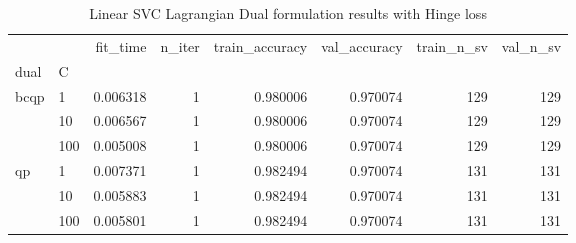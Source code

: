 \begin{table}[H]
\centering
\caption{Linear SVC Lagrangian Dual formulation results with Hinge loss}
\label{linear_lagrangian_dual_svc_cv_results}
\begin{tabular}{llrrrrrr}
\toprule
   &     &  fit\_time &  n\_iter &  train\_accuracy &  val\_accuracy &  train\_n\_sv &  val\_n\_sv \\
dual & C &           &         &                 &               &             &           \\
\midrule
bcqp & 1   &  0.006318 &       1 &        0.980006 &      0.970074 &         129 &       129 \\
   & 10  &  0.006567 &       1 &        0.980006 &      0.970074 &         129 &       129 \\
   & 100 &  0.005008 &       1 &        0.980006 &      0.970074 &         129 &       129 \\
qp & 1   &  0.007371 &       1 &        0.982494 &      0.970074 &         131 &       131 \\
   & 10  &  0.005883 &       1 &        0.982494 &      0.970074 &         131 &       131 \\
   & 100 &  0.005801 &       1 &        0.982494 &      0.970074 &         131 &       131 \\
\bottomrule
\end{tabular}
\end{table}

